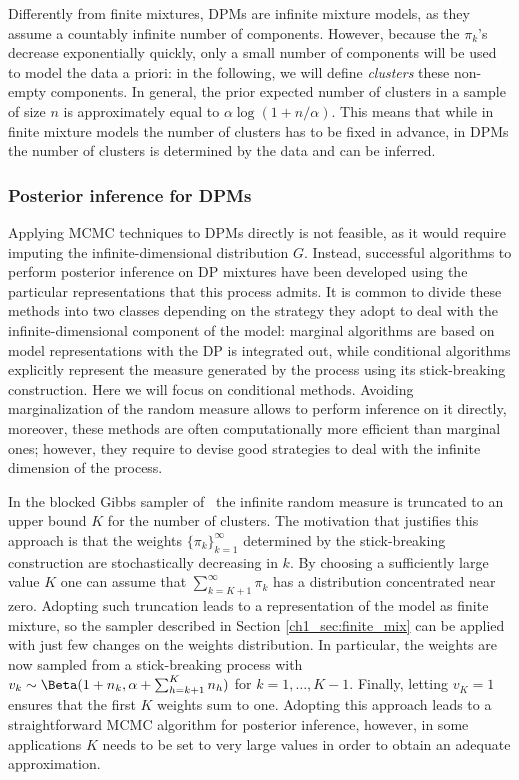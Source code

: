 Differently from finite mixtures, DPMs are infinite mixture models, as they assume a countably infinite number of components. 
However, because the $\pi_k$'s decrease exponentially quickly, only a small number of components will be used to model the
data a priori: in the following, we will define \textit{clusters} these non-empty components. In general, the prior expected number of clusters in a sample of size $n$ is approximately equal to $\alpha \log(1 + n/\alpha)$.
This means that while in finite mixture models the number of clusters has to be fixed in advance, in DPMs the number of clusters is determined by the data and can be inferred.

\subsubsection*{Posterior inference for DPMs}
Applying MCMC techniques to DPMs directly is not feasible, as it would require imputing the infinite-dimensional distribution $G$. Instead, successful algorithms to perform posterior inference on DP mixtures have been developed using the particular representations that this process admits. 
It is common to divide these methods into two classes depending on the strategy they adopt to deal with the infinite-dimensional component of the model: marginal algorithms are based on model representations with the DP is integrated out, while conditional algorithms explicitly represent the measure generated by the process using its stick-breaking construction.
Here we will focus on conditional methods. Avoiding marginalization of the random measure allows to perform inference on it directly, moreover, these methods are often computationally more efficient than marginal ones; however, they require to devise good strategies to deal with the infinite dimension of the process.

In the blocked Gibbs sampler of~\citet{ishwaran2001} the infinite random measure is truncated to an upper bound $K$ for the number of clusters. The motivation that justifies this approach is that the weights $\{\pi_k\}_{k=1}^{\infty}$ determined by the stick-breaking construction are stochastically decreasing in $k$. By choosing a sufficiently large value $K$ one can assume that $\sum_{k=K+1}^{\infty} \pi_k$ has a distribution concentrated near zero.
Adopting such truncation leads to a representation of the model as finite mixture, so the sampler described in Section \ref{ch1_sec:finite_mix} can be applied with just few changes on the weights distribution. In particular, the weights are now sampled from a stick-breaking process with $v_k \sim \Beta(1+n_k, \alpha + \sum_{h=k+1}^K n_h)$ for $k = 1,\dots,K-1$. Finally, letting $v_K = 1$ ensures that the first $K$ weights sum to one. Adopting this approach leads to a straightforward MCMC algorithm for posterior inference, however, in some applications $K$ needs to be set to very large values in order to obtain an adequate approximation.

